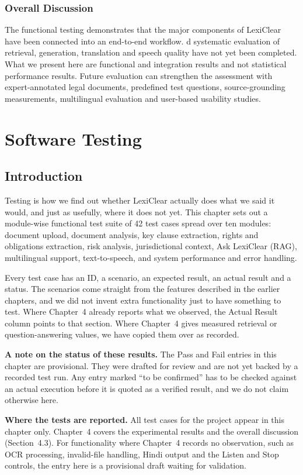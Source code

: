\documentclass[12pt,a4paper,oneside]{report}
\begin{document}
\subsection{Overall Discussion}
The functional testing demonstrates that the major components of LexiClear have been connected into an end-to-end workflow. d systematic evaluation of retrieval, generation, translation and speech quality have not yet been completed. What we present here are functional and integration results and not statistical performance results. Future evaluation can strengthen the assessment with expert-annotated legal documents, predefined test questions, source-grounding measurements, multilingual evaluation and user-based usability studies.

\chapter{Software Testing}

\section{Introduction}
Testing is how we find out whether LexiClear actually does what we said it would, and just as usefully, where it does not yet. This chapter sets out a module-wise functional test suite of 42 test cases spread over ten modules: document upload, document analysis, key clause extraction, rights and obligations extraction, risk analysis, jurisdictional context, Ask LexiClear (RAG), multilingual support, text-to-speech, and system performance and error handling.

Every test case has an ID, a scenario, an expected result, an actual result and a status. The scenarios come straight from the features described in the earlier chapters, and we did not invent extra functionality just to have something to test. Where Chapter~4 already reports what we observed, the Actual Result column points to that section. Where Chapter~4 gives measured retrieval or question-answering values, we have copied them over as recorded.

\textbf{A note on the status of these results.} The Pass and Fail entries in this chapter are provisional. They were drafted for review and are not yet backed by a recorded test run. Any entry marked ``to be confirmed'' has to be checked against an actual execution before it is quoted as a verified result, and we do not claim otherwise here.

\textbf{Where the tests are reported.} All test cases for the project appear in this chapter only. Chapter~4 covers the experimental results and the overall discussion (Section~4.3). For functionality where Chapter~4 records no observation, such as OCR processing, invalid-file handling, Hindi output and the Listen and Stop controls, the entry here is a provisional draft waiting for validation.
\end{document}
